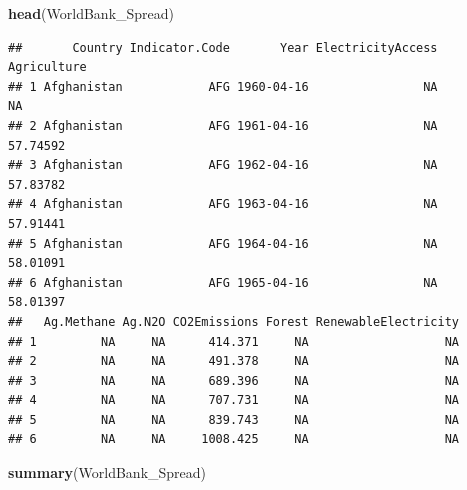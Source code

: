 \documentclass[12pt,]{article}
\newenvironment{Shaded}{\begin{snugshade}}{\end{snugshade}}
\newcommand{\KeywordTok}[1]{\textcolor[rgb]{0.13,0.29,0.53}{\textbf{#1}}}
\newcommand{\NormalTok}[1]{#1}
\begin{document}
\begin{Shaded}
\begin{Highlighting}[]
\KeywordTok{head}\NormalTok{(WorldBank_Spread)}
\end{Highlighting}
\end{Shaded}

\begin{verbatim}
##       Country Indicator.Code       Year ElectricityAccess Agriculture
## 1 Afghanistan            AFG 1960-04-16                NA          NA
## 2 Afghanistan            AFG 1961-04-16                NA    57.74592
## 3 Afghanistan            AFG 1962-04-16                NA    57.83782
## 4 Afghanistan            AFG 1963-04-16                NA    57.91441
## 5 Afghanistan            AFG 1964-04-16                NA    58.01091
## 6 Afghanistan            AFG 1965-04-16                NA    58.01397
##   Ag.Methane Ag.N2O CO2Emissions Forest RenewableElectricity
## 1         NA     NA      414.371     NA                   NA
## 2         NA     NA      491.378     NA                   NA
## 3         NA     NA      689.396     NA                   NA
## 4         NA     NA      707.731     NA                   NA
## 5         NA     NA      839.743     NA                   NA
## 6         NA     NA     1008.425     NA                   NA
\end{verbatim}

\begin{Shaded}
\begin{Highlighting}[]
\KeywordTok{summary}\NormalTok{(WorldBank_Spread)}
\end{Highlighting}
\end{Shaded}
\end{document}
